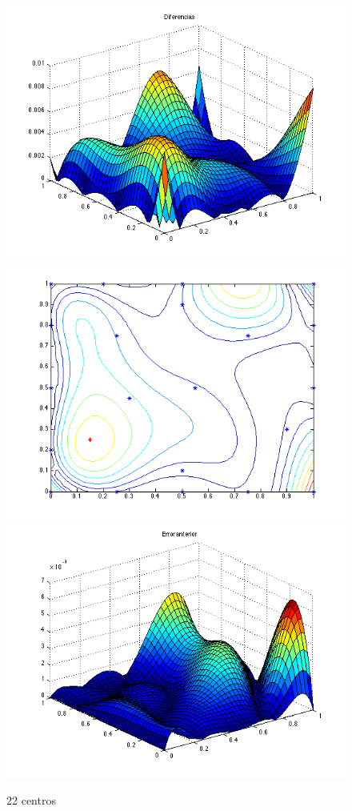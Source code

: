 \documentclass[11pt,a4paper]{article}
\begin{document}
\begin{figure}[H]
\centering

\includegraphics[scale=0.35]{diferencias22.png}
\includegraphics[scale=0.35]{centros22.png}
\includegraphics[scale=0.35]{error22.png}
\caption{22 centros}
\end{figure}
\end{document}
